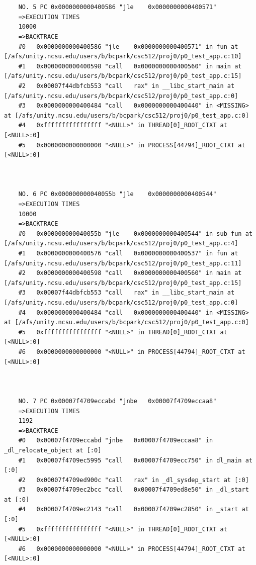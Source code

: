 \documentclass[11pt]{article}
\begin{document}
\begin{verbatim}
    
    
    NO. 5 PC 0x0000000000400586 "jle    0x0000000000400571"
    =>EXECUTION TIMES
    10000
    =>BACKTRACE
    #0   0x0000000000400586 "jle    0x0000000000400571" in fun at [/afs/unity.ncsu.edu/users/b/bcpark/csc512/proj0/p0_test_app.c:10]
    #1   0x0000000000400598 "call   0x0000000000400560" in main at [/afs/unity.ncsu.edu/users/b/bcpark/csc512/proj0/p0_test_app.c:15]
    #2   0x00007f44dbfcb553 "call   rax" in __libc_start_main at [/afs/unity.ncsu.edu/users/b/bcpark/csc512/proj0/p0_test_app.c:0]
    #3   0x0000000000400484 "call   0x0000000000400440" in <MISSING> at [/afs/unity.ncsu.edu/users/b/bcpark/csc512/proj0/p0_test_app.c:0]
    #4   0xffffffffffffffff "<NULL>" in THREAD[0]_ROOT_CTXT at [<NULL>:0]
    #5   0x0000000000000000 "<NULL>" in PROCESS[44794]_ROOT_CTXT at [<NULL>:0]
    
    
    
    NO. 6 PC 0x000000000040055b "jle    0x0000000000400544"
    =>EXECUTION TIMES
    10000
    =>BACKTRACE
    #0   0x000000000040055b "jle    0x0000000000400544" in sub_fun at [/afs/unity.ncsu.edu/users/b/bcpark/csc512/proj0/p0_test_app.c:4]
    #1   0x0000000000400576 "call   0x0000000000400537" in fun at [/afs/unity.ncsu.edu/users/b/bcpark/csc512/proj0/p0_test_app.c:11]
    #2   0x0000000000400598 "call   0x0000000000400560" in main at [/afs/unity.ncsu.edu/users/b/bcpark/csc512/proj0/p0_test_app.c:15]
    #3   0x00007f44dbfcb553 "call   rax" in __libc_start_main at [/afs/unity.ncsu.edu/users/b/bcpark/csc512/proj0/p0_test_app.c:0]
    #4   0x0000000000400484 "call   0x0000000000400440" in <MISSING> at [/afs/unity.ncsu.edu/users/b/bcpark/csc512/proj0/p0_test_app.c:0]
    #5   0xffffffffffffffff "<NULL>" in THREAD[0]_ROOT_CTXT at [<NULL>:0]
    #6   0x0000000000000000 "<NULL>" in PROCESS[44794]_ROOT_CTXT at [<NULL>:0]
    
    
    
    NO. 7 PC 0x00007f4709eccabd "jnbe   0x00007f4709eccaa8"
    =>EXECUTION TIMES
    1192
    =>BACKTRACE
    #0   0x00007f4709eccabd "jnbe   0x00007f4709eccaa8" in _dl_relocate_object at [:0]
    #1   0x00007f4709ec5995 "call   0x00007f4709ecc750" in dl_main at [:0]
    #2   0x00007f4709ed900c "call   rax" in _dl_sysdep_start at [:0]
    #3   0x00007f4709ec2bcc "call   0x00007f4709ed8e50" in _dl_start at [:0]
    #4   0x00007f4709ec2143 "call   0x00007f4709ec2850" in _start at [:0]
    #5   0xffffffffffffffff "<NULL>" in THREAD[0]_ROOT_CTXT at [<NULL>:0]
    #6   0x0000000000000000 "<NULL>" in PROCESS[44794]_ROOT_CTXT at [<NULL>:0]
    

\end{verbatim}
\end{document}
